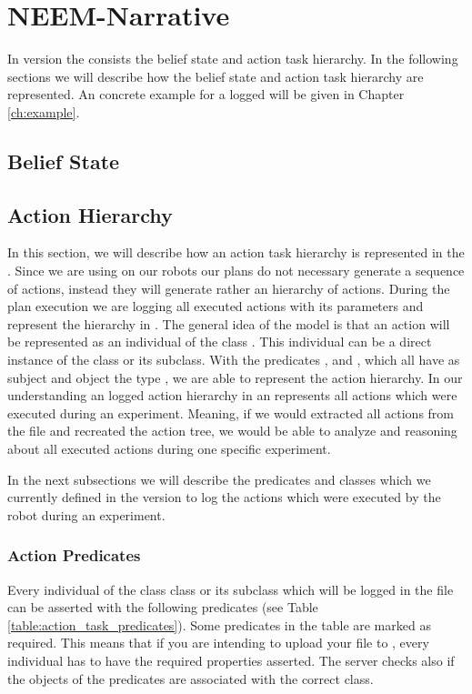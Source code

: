 \chapter{NEEM-Narrative}
\label{ch:narrative}
In version \neemversion the \neemnar consists the belief state and action task hierarchy. 
In the following sections we will describe how the belief state and action task hierarchy are represented.
An concrete example for a logged \neemnar will be given in Chapter \ref{ch:example}.

\section{Belief State}


\section{Action Hierarchy}
\label{ch:narrative,sec:actionHierarchy}
In this section, we will describe how an action task hierarchy is represented in the \neemnar. 
Since we are using \cram on our robots our plans do not necessary generate a sequence of actions, instead they will generate rather an hierarchy of actions.
During the plan execution we are logging all executed actions with its parameters and represent the hierarchy in \owl.
The general idea of the model is that an action will be represented as an individual of the class .
This individual can be a direct instance of the class  or its subclass.
With the predicates ,  and , which all have as subject and object the type , we are able to represent the action hierarchy.
In our understanding an logged action hierarchy in an \owl represents all actions which were executed during an experiment.
Meaning, if we would extracted all actions from the \owl file and recreated the action tree, we would be able to analyze and reasoning about all executed actions during one specific experiment.

In the next subsections we will describe the predicates and classes which we currently defined in the version \neemversion to log the actions which were executed by the robot during an experiment. 

\subsection{Action Predicates}
Every individual of the class  class or its subclass which will be logged in the \owl file can be asserted with the following predicates (see Table \ref{table:action_task_predicates}).
Some predicates in the table are marked as required.
This means that if you are intending to upload your \owl file to \openease, every  individual has to have the required properties asserted.
The \openease server checks also if the objects of the predicates are associated with the correct class.

